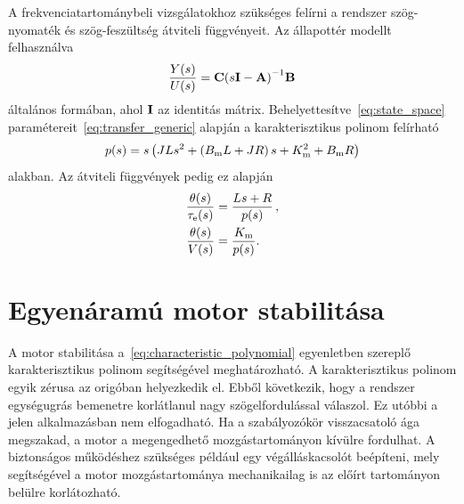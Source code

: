 A frekvenciatartománybeli vizsgálatokhoz szükséges felírni a rendszer 
szög-nyomaték és szög-feszültség átviteli függvényeit. Az állapottér modellt felhasználva
\begin{align}\label{eq:transfer_generic}
    \frac{Y(s)}{U(s)} = \mathbf{C}{\left(s \mathbf{I} - \mathbf{A}\right)}^{-1} \mathbf{B}
\end{align}
általános formában, ahol $\mathbf{I}$ az identitás mátrix. Behelyettesítve~\eqref{eq:state_space} 
paramétereit~\eqref{eq:transfer_generic} alapján a karakterisztikus polinom felírható
\begin{align}\label{eq:characteristic_polynomial}
    p(s) = s\left(JLs^2 + \left(B_{\mathrm{m}} L + JR\right)s + K_{\mathrm{m}}^2 + B_{\mathrm{m}} R\right)
\end{align}
alakban. Az átviteli függvények pedig ez alapján
\begin{equation}\label{eq:transfer_function}
    \begin{split}
        \frac{\theta(s)}{\tau_{\mathrm{e}}(s)} &= \frac{Ls + R}{p(s)}\,,\\
        \frac{\theta(s)}{V(s)} &= \frac{K_{\mathrm{m}}}{p(s)}.
    \end{split}
\end{equation}

\section{Egyenáramú motor stabilitása}
A motor stabilitása a~\eqref{eq:characteristic_polynomial} egyenletben szereplő karakterisztikus 
polinom segítségével meghatározható.
A karakterisztikus polinom egyik zérusa az origóban helyezkedik el. Ebből következik, hogy a rendszer
egységugrás bemenetre korlátlanul nagy szögelfordulással válaszol. Ez utóbbi a jelen alkalmazásban nem elfogadható. 
Ha a szabályozókör visszacsatoló ága megszakad, a motor a megengedhető mozgástartományon kívülre fordulhat.
A biztonságos működéshez szükséges például egy végálláskacsolót beépíteni, mely segítségével a motor 
mozgástartománya mechanikailag is az előírt tartományon belülre korlátozható.

